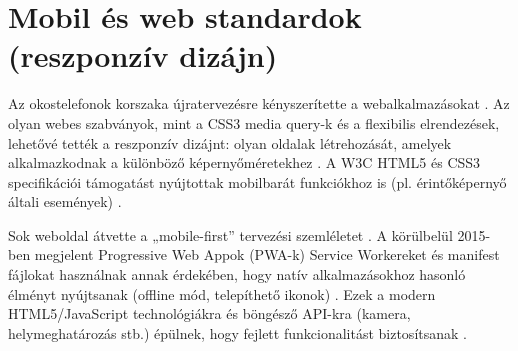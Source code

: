 \section{Mobil és web standardok (reszponzív dizájn)}
Az okostelefonok korszaka újratervezésre kényszerítette a webalkalmazásokat \cite{w3c2008mobileBestPractices}. Az olyan webes szabványok, mint a CSS3 media query-k és a flexibilis elrendezések, lehetővé tették a reszponzív dizájnt: olyan oldalak létrehozását, amelyek alkalmazkodnak a különböző képernyőméretekhez \cite{marcotte2010responsiveWebDesign,w3c2012mediaQueries}. A W3C HTML5 és CSS3 specifikációi támogatást nyújtottak mobilbarát funkciókhoz is (pl. érintőképernyő általi események) \cite{w3c2014html5,w3c2013touchEvents}.

Sok weboldal átvette a „mobile-first” tervezési szemléletet \cite{wroblewski2011mobileFirst}. A körülbelül 2015-ben megjelent Progressive Web Appok (PWA-k) Service Workereket és manifest fájlokat használnak annak érdekében, hogy natív alkalmazásokhoz hasonló élményt nyújtsanak (offline mód, telepíthető ikonok) \cite{russell2015progressiveApps,mdnWhatIsPwa}. Ezek a modern HTML5/JavaScript technológiákra és böngésző API-kra (kamera, helymeghatározás stb.) épülnek, hogy fejlett funkcionalitást biztosítsanak \cite{mdnGetUserMedia,w3c2024geolocation}.
